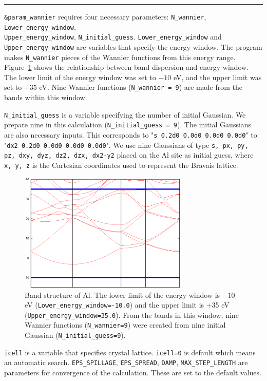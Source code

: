 \documentclass{article}
\begin{document}
\hrule\vspace{3mm}
\verb+&param_wannier+ requires four necessary parameters: \verb+N_wannier+, \verb+Lower_energy_window+, \\ \verb+Upper_energy_window+, {\tt N\_initial\_guess}. \verb+Lower_energy_window+ and \verb+Upper_energy_window+ are variables that specify the energy window. The program makes \verb+N_wannier+ pieces of the Wannier functions from this energy range. Figure~\ref{EW} shows the relationship between band dispersion and energy window. The lower limit of the energy window was set to $-10$ eV, and the upper limit was set to +35 eV. Nine Wannier functions (\verb+N_wannier = 9+) are made from the bands within this window.

\verb+N_initial_guess+ is a variable specifying the number of initial Gaussian. We prepare nine in this calculation (\verb+N_initial_guess = 9+). The initial Gaussians are also necessary inputs. This corresponds to "\verb+s 0.2d0 0.0d0 0.0d0 0.0d0+" to "\verb+dx2 0.2d0 0.0d0 0.0d0 0.0d0+". We use nine Gaussians of type {\tt s, px, py, pz, dxy, dyz, dz2, dzx, dx2-y2} placed on the Al site as initial guess, where {\tt x, y, z} is the Cartesian coordinates used to represent the Bravais lattice.
\begin{figure}[H] 
\centering
\includegraphics[width=8cm]{Energy-Window.Al.eps}
\caption{Band structure of Al. The lower limit of the energy window is $-10$ eV ({\tt Lower\_energy\_window=-10.0}) and the upper limit is +35 eV ({\tt Upper\_energy\_window=35.0}). From the bands in this window, nine Wannier functions ({\tt N\_wannier=9}) were created from nine initial Gaussian ({\tt N\_initial\_guess=9}).}
\label{EW}
\end{figure}

\verb+icell+ is a variable that specifies crystal lattice. \verb+icell=0+ is default which means an automatic search. \verb+EPS_SPILLAGE+, \verb+EPS_SPREAD+, \verb+DAMP+, \verb+MAX_STEP_LENGTH+ are parameters for convergence of the calculation. These are set to the default values.
\end{document}
